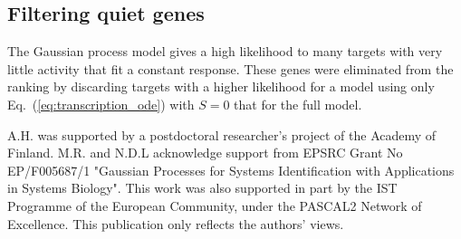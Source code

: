 \documentclass{pnastwo}
\begin{document}
\begin{article}
\begin{materials}
  \section{Filtering quiet genes}
  The Gaussian process model gives a high likelihood to many targets
  with very little activity that fit a constant response.  These genes
  were eliminated from the ranking by discarding targets with a higher
  likelihood for a model using only Eq.~(\ref{eq:transcription_ode})
  with $S=0$ that for the full model.
  
\end{materials}

\begin{acknowledgments}
A.H. was supported by a postdoctoral researcher's project of the Academy of Finland.
M.R. and N.D.L acknowledge support from EPSRC Grant No EP/F005687/1 "Gaussian Processes for Systems Identification with Applications in Systems Biology". 
This work was also supported in part by the IST Programme of the European Community, under the PASCAL2 Network of Excellence. This publication only reflects the authors' views.
\end{acknowledgments}




%
\end{article}

\end{document}
